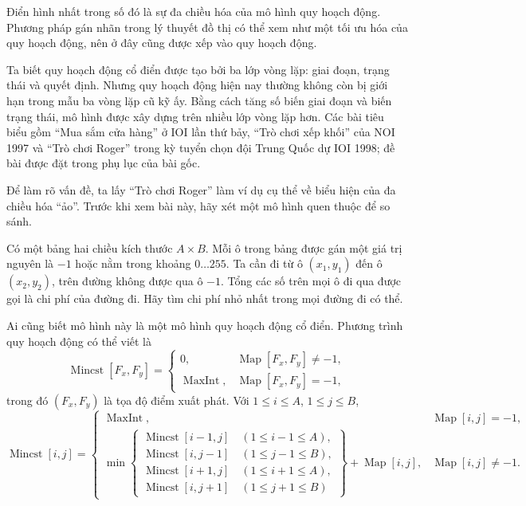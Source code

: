 \documentclass[11pt]{article}
\begin{document}
Điển hình nhất trong số đó là sự đa chiều hóa của mô hình quy hoạch động.
Phương pháp gán nhãn trong lý thuyết đồ thị có thể xem như một tối ưu hóa của
quy hoạch động, nên ở đây cũng được xếp vào quy hoạch động.

Ta biết quy hoạch động cổ điển được tạo bởi ba lớp vòng lặp: giai đoạn, trạng
thái và quyết định. Nhưng quy hoạch động hiện nay thường không còn bị giới
hạn trong mẫu ba vòng lặp cũ kỹ ấy. Bằng cách tăng số biến giai đoạn và biến
trạng thái, mô hình được xây dựng trên nhiều lớp vòng lặp hơn. Các bài tiêu
biểu gồm ``Mua sắm cửa hàng'' ở IOI lần thứ bảy, ``Trò chơi xếp khối'' của
NOI 1997 và ``Trò chơi Roger'' trong kỳ tuyển chọn đội Trung Quốc dự IOI
1998; đề bài được đặt trong phụ lục của bài gốc.

Để làm rõ vấn đề, ta lấy ``Trò chơi Roger'' làm ví dụ cụ thể về biểu hiện của
đa chiều hóa ``ảo''. Trước khi xem bài này, hãy xét một mô hình quen thuộc để
so sánh.

Có một bảng hai chiều kích thước \(A\times B\). Mỗi ô trong bảng được gán một
giá trị nguyên là \(-1\) hoặc nằm trong khoảng \(0\ldots255\). Ta cần đi từ ô
\((x_1,y_1)\) đến ô \((x_2,y_2)\), trên đường không được qua ô \(-1\). Tổng
các số trên mọi ô đi qua được gọi là chi phí của đường đi. Hãy tìm chi phí
nhỏ nhất trong mọi đường đi có thể.

Ai cũng biết mô hình này là một mô hình quy hoạch động cổ điển. Phương trình
quy hoạch động có thể viết là
\[
\operatorname{Mincst}[F_x,F_y]=
\begin{cases}
0, & \operatorname{Map}[F_x,F_y]\ne -1,\\
\operatorname{MaxInt}, & \operatorname{Map}[F_x,F_y]=-1,
\end{cases}
\]
trong đó \((F_x,F_y)\) là tọa độ điểm xuất phát. Với \(1\le i\le A\),
\(1\le j\le B\),
\[
\operatorname{Mincst}[i,j]=
\begin{cases}
\operatorname{MaxInt}, & \operatorname{Map}[i,j]=-1,\\
\min\left\{
\begin{array}{l}
\operatorname{Mincst}[i-1,j]\quad(1\le i-1\le A),\\
\operatorname{Mincst}[i,j-1]\quad(1\le j-1\le B),\\
\operatorname{Mincst}[i+1,j]\quad(1\le i+1\le A),\\
\operatorname{Mincst}[i,j+1]\quad(1\le j+1\le B)
\end{array}
\right\}+\operatorname{Map}[i,j],
& \operatorname{Map}[i,j]\ne -1.
\end{cases}
\]
\end{document}
